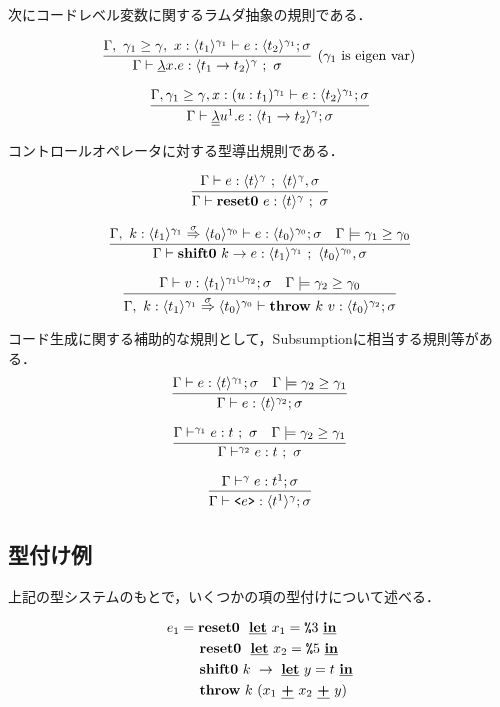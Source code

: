 次にコードレベル変数に関するラムダ抽象の規則である．

\[
  \infer[(\gamma_1~\text{is eigen var})]
  {\Gamma \vdash \cfun{x}{e} : \codeT{t_1\to t_2}{\gamma} ~;~ \sigma}
  {\Gamma,~\gamma_1 \ord \gamma,~x:\codeT{t_1}{\gamma_1} \vdash e
    : \codeT{t_2}{\gamma_1}; \sigma}
\]

\[
  \infer
  {\Gamma \vdash \ccfun{u^1}{e} : \codeT{t_1 \to t_2}{\gamma} ; \sigma}
  {\Gamma, \gamma_1 \ord \gamma, x : (u : t_1)^{\gamma_1} \vdash e : \codeT{t_2}{\gamma_1} ; \sigma}
\]

コントロールオペレータに対する型導出規則である．

\[
  \infer{\Gamma \vdash \resetz{e} : \codeT{t}{\gamma} ~;~ \sigma}
  {\Gamma \vdash e : \codeT{t}{\gamma} ~;~ \codeT{t}{\gamma}, \sigma}
\]

\[
  \infer{\Gamma \vdash \shiftz{k}{e} : \codeT{t_1}{\gamma_1} ~;~ \codeT{t_0}{\gamma_0},\sigma}
  {\Gamma,~k:\contT{\codeT{t_1}{\gamma_1}}{\codeT{t_0}{\gamma_0}}{\sigma}
    \vdash e : \codeT{t_0}{\gamma_0} ; \sigma
    & \Gamma \models \gamma_1 \ord \gamma_0
  }
\]

\[
  \infer
  {\Gamma,~k:\contT{\codeT{t_1}{\gamma_1}}{\codeT{t_0}{\gamma_0}}{\sigma}
    \vdash \throw{k}{v} : \codeT{t_0}{\gamma_2} ; \sigma}
  {\Gamma
    \vdash v : \codeT{t_1}{\gamma_1 \cup \gamma_2} ; \sigma
    & \Gamma \models \gamma_2 \ord \gamma_0
  }
\]

コード生成に関する補助的な規則として，Subsumptionに相当する規則等がある．
\[
  \infer
  {\Gamma \vdash e : \codeT{t}{\gamma_2} ; \sigma}
  {\Gamma \vdash e : \codeT{t}{\gamma_1} ; \sigma
    & \Gamma \models \gamma_2 \ord \gamma_1
  }
\]

\[
  \infer
  {\Gamma \vdash^{\gamma_2} e : t ~;~ \sigma}
  {\Gamma \vdash^{\gamma_1} e : t ~;~ \sigma
    & \Gamma \models \gamma_2 \ord \gamma_1
  }
\]


\[
  \infer
  {\Gamma \vdash \code{e} : \codeT{t^1}{\gamma} ; \sigma}
  {\Gamma \vdash^{\gamma} e : t^1 ; \sigma}
\]


\subsection{型付け例}

上記の型システムのもとで，いくつかの項の型付けについて述べる．

\begin{align*}
  e_1 & = \textbf{reset0} ~~\underline{\textbf{let}}~x_1=\texttt{\%}{3}~\underline{\textbf{in}} \\
      & \phantom{=}~~ \textbf{reset0} ~~\underline{\textbf{let}}~x_2=\texttt{\%}{5}~\underline{\textbf{in}} \\
      & \phantom{=}~~ \textbf{shift0}~k~\to~\underline{\textbf{let}}~y=t~\underline{\textbf{in}} \\
      & \phantom{=}~~ \textbf{throw}~k~(x_1~\underline{\textbf{+}}~x_2~\underline{\textbf{+}}~y)
\end{align*}

